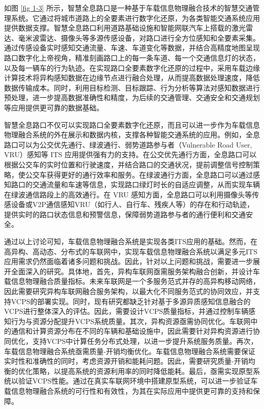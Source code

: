 如图 \ref{fig 1-3} 所示，智慧全息路口是一种基于车载信息物理融合技术的智慧交通管理系统。它通过将城市道路上的全要素进行数字化还原，为各类智能交通系统应用提供数据支撑。智慧全息路口利用道路基础设施和智能网联汽车上搭载的激光雷达、毫米波雷达、摄像头等多源传感设备，对路口进行全方位感知和全要素采集。通过传感设备实时感知交通流量、车速、车道变化等数据，并结合高精度地图呈现路口数字化上帝视角，精准刻画路口上的每一条车道、每一个交通信息灯的状态，以及每一辆车的行为轨迹。在实现路口全要素数字化还原的过程中，采用车载边缘计算技术将异构感知数据在边缘节点进行融合处理，从而提高数据处理速度，降低数据传输成本。同时，利用目标检测、目标跟踪、行为分析等算法对感知数据进行预处理，进一步提高数据准确性和精度，为后续的交通管理、交通安全和交通规划等应用提供更可靠的数据基础。

智慧全息路口不仅可以实现路口全要素数字化还原，而且可以进一步作为车载信息物理融合系统的外在展示和数据内核，支撑各种智能交通系统的应用。例如，全息路口可以为公交优先通行、绿波通行、弱势道路参与者（Vulnerable Road User, VRU）感知等 ITS 应用提供强有力的支持。在公交优先通行方面，全息路口可以根据公交车的实时位置和行驶速度，并结合路口的交通状况，提前调整信号控制策略，使公交车获得更好的通行效率和服务。在绿波通行方面，全息路口可以通过感知路口的交通流量和车速等信息，实现路口绿灯时长的自适应调整，从而实现车辆在绿波通信路段上的高效通行。在 VRU 感知方面，全息路口可以利用摄像头等传感设备或V2P通信感知VRU（如行人、自行车、残疾人等）的存在和行动轨迹，提供实时的路口状态信息和预警信息，保障弱势道路参与者的通行便利和交通安全。

通过以上讨论可知，车载信息物理融合系统是实现各类ITS应用的基础。然而，在高异构、高动态、分布式的车联网中，实现车载信息物理融合系统以满足多元ITS应用需求仍然面临着诸多问题和挑战。因此，针对以上问题和挑战，需要进一步展开全面深入的研究。具体地，首先，异构车联网亟需服务架构融合创新，并设计车载信息物理融合质量指标。未来车联网是一个多服务范式并存的高异构移动网络，因此需要研究异构车联网融合服务架构，以最大化不同服务范式的协同效应，并支持VCPS的部署实现。同时，现有研究都缺乏针对基于多源异质感知信息融合的VCPS进行整体深入的评估。因此，需要设计VCPS质量指标，并通过控制车辆感知行为与资源分配提升VCPS系统质量。其次，异构资源亟需协同优化。车联网中的通信和计算资源分布在不同的车辆和基础设施中，因此需要针对异构资源进行协同优化，支持VCPS中计算任务分布式处理，以进一步提升系统服务质量。再次，车载信息物理融合系统亟需质量-开销均衡优化。车载信息物理融合系统需要保证实时性和准确性的同时，考虑资源开销和能耗问题。因此，需要研究质量-开销均衡的优化策略，以提高系统的资源利用率的同时降低能耗。最后，亟需实现原型系统以验证VCPS性能。通过在真实车联网环境中搭建原型系统，可以进一步验证车载信息物理融合系统的可行性和有效性，为其在实际应用中提供更可靠的支持和保障。


